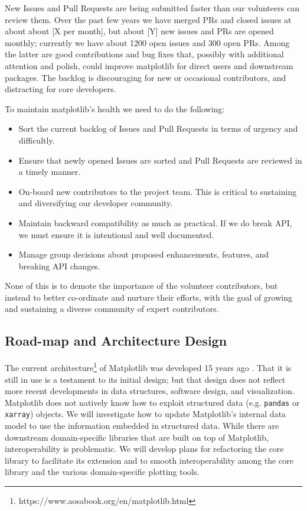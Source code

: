 \documentclass[11pt]{article}  %
\begin{document}
New Issues and Pull Requests are being submitted faster than our
volunteers can review them.
Over the past few years we have merged PRs and closed
issues at about about [X per month], but about [Y] new issues and PRs
are opened monthly; currently we have about 1200 open issues and
300 open PRs.  Among the latter are good contributions and bug fixes
that, possibly with additional attention and polish, could improve
matplotlib for direct users and downstream packages.  The backlog is
discouraging for new or occasional contributors, and distracting for
core developers.

To maintain matplotlib's health we need to do the following:

\begin{itemize}
\item Sort the current backlog of Issues and Pull Requests
  in terms of urgency and difficultly.
\item Ensure that newly opened Issues are sorted and Pull Requests
  are reviewed in a timely manner.
\item On-board new contributors to the project team.  This is
  critical to sustaining and diversifying our developer community.
\item Maintain backward compatibility as much as practical.  If we
  do break API, we must ensure it is intentional and well documented.
\item Manage group decisions about proposed enhancements, features, and
  breaking API changes.
\end{itemize}

None of this is to demote the importance of the volunteer
contributors, but instead to better co-ordinate and nurture their
efforts, with the goal of growing and sustaining a diverse community
of expert contributors.

\subsection{Road-map and Architecture Design}

The current
architecture\footnote{https://www.aosabook.org/en/matplotlib.html} of
Matplotlib was developed 15 years ago \cite{Hunter:2007}.  That
it is still in use is a testament to its initial design; but that
design does not reflect more recent developments in data
structures, software design, and visualization.
Matplotlib does not natively know how to exploit structured data
(e.g. \texttt{pandas} or \texttt{xarray}) objects.  We will investigate
how to update Matplotlib's internal data model to use the
information embedded in structured data.  While there are downstream
domain-specific libraries that are built on top of Matplotlib,
interoperability is problematic.  We will develop plans for
refactoring the core library to facilitate its
extension and to smooth interoperability among the core
library and the various domain-specific plotting tools.
\end{document}
